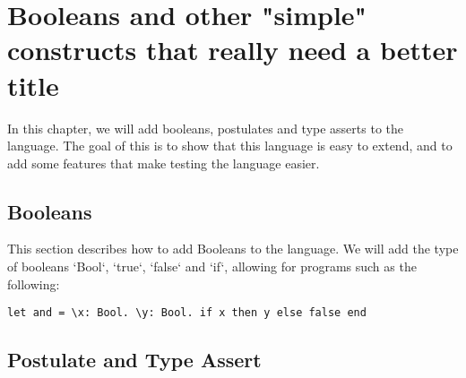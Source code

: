 \chapter{\label{chap:bools}Booleans and other "simple" constructs that really need a better title}

In this chapter, we will add booleans, postulates and type asserts to the language. The goal of this is to show that this language is easy to extend, and to add some features that make testing the language easier.

\section{Booleans}

This section describes how to add Booleans to the language. We will add the type of booleans `Bool`, `true`, `false` and `if`, allowing for programs such as the following: 

\begin{lstlisting}
let and = \x: Bool. \y: Bool. if x then y else false end
\end{lstlisting}

\section{Postulate and Type Assert}

